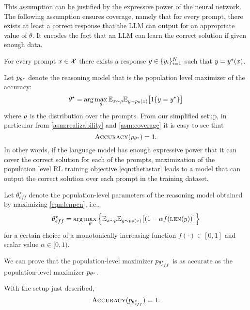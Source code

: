 This assumption can be justified by the expressive power of the neural network. The following assumption ensures coverage, namely that for every prompt, there exists at least a correct response that the LLM can output for an appropriate value of $\theta$.
It encodes the fact that an LLM 
can learn the correct solution if given enough data.
\begin{assumption}[Coverage]
\label{asm:coverage}
For every prompt $x{} \in \mathcal X$ there exists a response $y \in \{y_i \}_{i=1}^{N}$ such that 
$y = y^\star(x{})$.
\end{assumption}

Let $p_{\theta^\star}$ denote the reasoning model that is the population level maximizer of the accuracy:
\begin{equation}
\label{eqn:thetastar}
   \theta^\star = \arg\max_{\theta} \mathbb E_{x \sim \rho} \mathbb E_{y \sim p_\theta(x{})} \big[ {1}\{ y = y^\star \} \big]
\end{equation}
where $\rho$ is the distribution over the prompts.
From our simplified setup, in particular from  \cref{asm:realizability} and \cref{asm:coverage} it is easy to see that 
\begin{equation}
    \textsc{Accuracy}(p_{ \theta^\star}) = 1.
\end{equation}
In other words, if the language model has enough expressive power 
that it can cover the correct solution for each of the prompts, maximization of the population level RL training objective \eqref{eqn:thetastar} leads to a model that can output the correct solution over each prompt in the training dataset.

Let $\theta^\star_{eff}$ denote the population-level parameters of the reasoning model obtained by maximizing \cref{eqn:lenpen}, i.e.,
\begin{equation}
   \theta^\star_{eff} = \arg\max_{\theta} \Big\{ \mathbb E_{x \sim \rho} \mathbb E_{y \sim p_\theta(x{})} \big[ ( 1 - \alpha f(\textsc{len}(y) ) \big] \Big\}
\end{equation}
for a certain choice of a monotonically increasing function $f(\cdot) \in [0,1]$ and scalar value $\alpha \in [0, 1)$.


We can prove that the population-level maximizer $p_{\theta^\star_{eff}}$ 
is as accurate as the population-level maximizer  $p_{\theta^\star}$.
\begin{proposition}
\label{prop:accuracy}
    With the setup just described,  
    \begin{equation}
    \textsc{Accuracy}(p_{\theta^\star_{eff}}) = 1.
    \end{equation}
\end{proposition}

